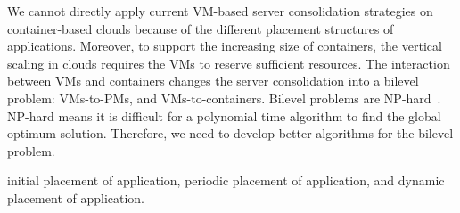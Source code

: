 We cannot directly apply current VM-based server consolidation strategies on container-based clouds because 
of the different placement structures of applications. Moreover, to support the increasing size of containers, 
the vertical scaling in clouds requires the VMs to reserve sufficient resources. The interaction between VMs and containers changes 
the server consolidation into a bilevel problem: VMs-to-PMs, and VMs-to-containers. Bilevel problems are NP-hard~\cite{Sinha:2013tn}.  NP-hard means it is difficult for a polynomial time algorithm to find the global optimum solution. Therefore, we need to develop better algorithms for the bilevel problem.

initial placement of application, periodic placement of application, and dynamic placement of application.








\vspace{5mm}
